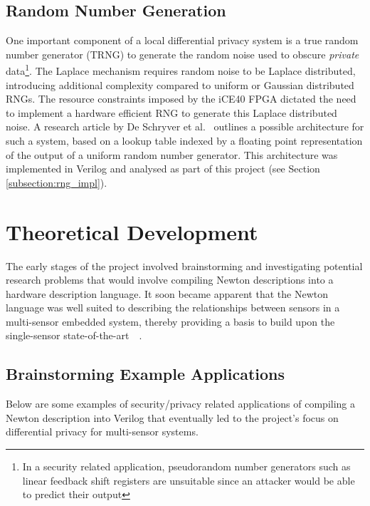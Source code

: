 \documentclass[12pt]{article}
\begin{document}
  \subsection{Random Number Generation} \label{subsection:intro_rng}
    One important component of a local differential privacy system is a true random number generator (TRNG) to generate the random noise used to obscure \textit{private} data\footnote{In a security related application, pseudorandom number generators such as linear feedback shift registers are unsuitable since an attacker would be able to predict their output}. The Laplace mechanism requires random noise to be Laplace distributed, introducing additional complexity compared to uniform or Gaussian distributed RNGs. The resource constraints imposed by the iCE40 FPGA dictated the need to implement a hardware efficient RNG to generate this Laplace distributed noise. A research article by De Schryver et al.~\cite{DeSchryver} outlines a possible architecture for such a system, based on a lookup table indexed by a floating point representation of the output of a uniform random number generator. This architecture was implemented in Verilog and analysed as part of this project (see Section \ref{subsection:rng_impl}).
\newpage



%
%

\section{Theoretical Development}
  The early stages of the project involved brainstorming and investigating potential research problems that would involve compiling Newton descriptions into a hardware description language. It soon became apparent that the Newton language was well suited to describing the relationships between sensors in a multi-sensor embedded system, thereby providing a basis to build upon the single-sensor state-of-the-art~\cite{Choi2018GuaranteeingLD}~\cite{diffpriv_2006}.
  \subsection{Brainstorming Example Applications}
    Below are some examples of security/privacy related applications of compiling a Newton description into Verilog that eventually led to the project's focus on differential privacy for multi-sensor systems.
\end{document}
